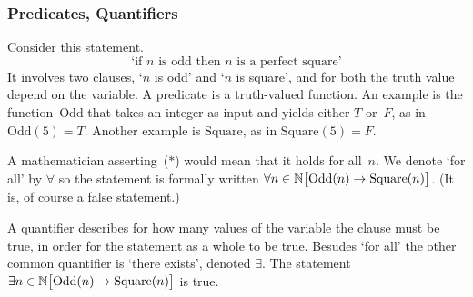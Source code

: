 \documentclass[10pt,t]{beamer}
\begin{document}
\begin{frame}
\frametitle{Predicates, Quantifiers}
Consider this statement. 
\begin{equation*}
  \text{`if $n$ is odd then $n$ is a perfect square'}
  \tag{$*$}
\end{equation*}
\pause
It involves two clauses, `$n$ is odd' and `$n$ is square',
and for both the truth value depend on the variable.
A \alert{predicate} is a truth-valued function.
An example is the function~$\text{Odd}$ that takes an integer as input and 
yields either $T$ or~$F$, as in~$\text{Odd}(5)=T$.
Another example is $\text{Square}$, as in $\text{Square}(5)=F$.

\pause
A mathematician asserting~($*$) would mean that
it holds for all~$n$.
We denote `for all' by $\forall$ so the statement is formally written
$\forall n\in\mathbb{N} \big[\text{Odd}(n)\rightarrow\text{Square}(n)\big]$.
(It is, of course a false statement.)

\pause
A
\alert{quantifier} describes for how many values of the
variable the clause must be true, in order for the statement as a whole to
be true.
Besudes `for all' 
the other common quantifier is 
`there exists', denoted $\exists$.
The statement
$\exists n\in\mathbb{N} \big[\text{Odd}(n)\rightarrow\text{Square}(n)\big]$
is true.
\end{frame}
\end{document}
